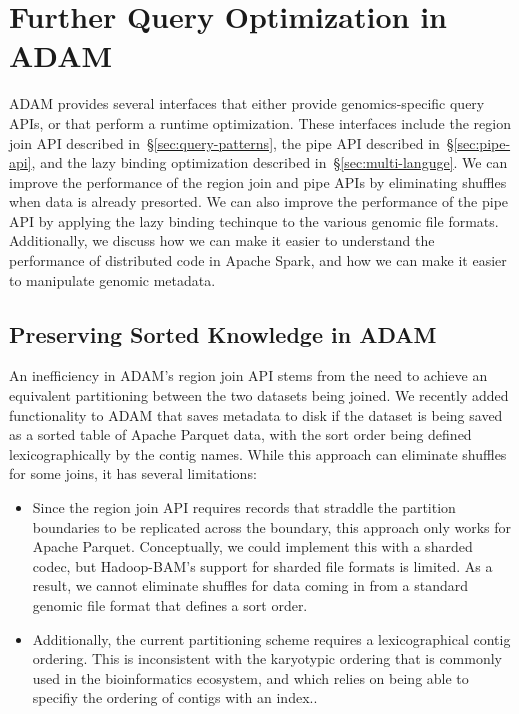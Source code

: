 \documentclass[phd]{ucbthesis}
\begin{document}
\section{Further Query Optimization in {ADAM}}
\label{sec:extensions-adam}

{ADAM} provides several interfaces that either provide genomics-specific
query APIs, or that perform a runtime optimization. These interfaces include the
region join API described in~\S\ref{sec:query-patterns}, the {pipe} API
described in~\S\ref{sec:pipe-api}, and the lazy binding optimization described
in~\S\ref{sec:multi-languge}. We can improve the performance of the region join
and {pipe} APIs by eliminating shuffles when data is already presorted.
We can also improve the performance of the {pipe} API by applying the
lazy binding techinque to the various genomic file formats. Additionally, we
discuss how we can make it easier to understand the performance of distributed
code in {Apache Spark}, and how we can make it easier to manipulate
genomic metadata.

\subsection{Preserving Sorted Knowledge in {ADAM}}
\label{sec:sorted-knowledge}

An inefficiency in {ADAM}'s region join API stems from the need to
achieve an equivalent partitioning between the two datasets being joined. We
recently added functionality to {ADAM} that saves metadata to disk if the
dataset is being saved as a sorted table of {Apache Parquet} data, with
the sort order being defined lexicographically by the contig names. While this
approach can eliminate shuffles for some joins, it has several limitations:

\begin{itemize}
\item Since the region join API requires records that straddle the partition
  boundaries to be replicated across the boundary, this approach only works for
  {Apache Parquet}. Conceptually, we could implement this with a sharded
  codec, but {Hadoop-BAM}'s support for sharded file formats is limited.
  As a result, we cannot eliminate shuffles for data coming in from a standard
  genomic file format that defines a sort order.
\item Additionally, the current partitioning scheme requires a lexicographical
  contig ordering. This is inconsistent with the karyotypic ordering that is
  commonly used in the bioinformatics ecosystem, and which relies on being
  able to specifiy the ordering of contigs with an index..
\end{itemize}
\end{document}
